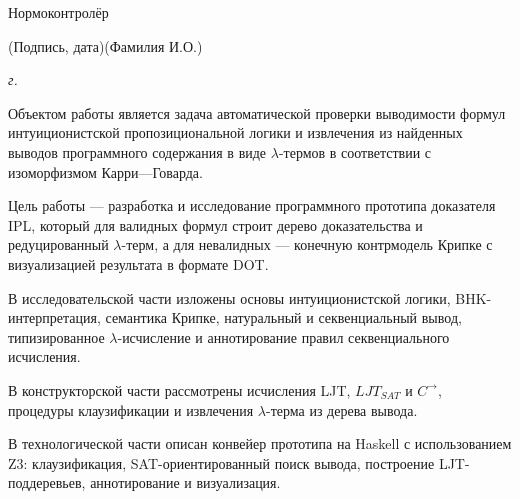 \documentclass[14pt, russian]{scrartcl}
\begin{document}
\begin{titlepage}
\noindent Нормоконтролёр  \hfill \underline{\hspace{4cm}}\quad
{}

\vspace{-0.5ex}
\noindent\hspace{13.5ex}\normalsize\hspace{170pt}\hspace{2ex}\scriptsize{(Подпись, дата)}\normalsize\hspace{30pt}\hspace{6ex}\scriptsize{(Фамилия И.О.)}\normalsize
\vfill

 


\begin{center}
\textsl{\the\year{} г.}
\end{center}
\end{titlepage}


\setlength{\tabcolsep}{3pt}
\newpage
\setcounter{page}{2}

Объектом работы является задача автоматической проверки выводимости формул
интуиционистской пропозициональной логики и извлечения из найденных выводов
программного содержания в виде $\lambda$-термов в соответствии с изоморфизмом
Карри---Говарда.

Цель работы --- разработка и исследование программного прототипа доказателя IPL,
который для валидных формул строит дерево доказательства и редуцированный
$\lambda$-терм, а для невалидных --- конечную контрмодель Крипке с визуализацией
результата в формате DOT.

В исследовательской части изложены основы интуиционистской логики, BHK-интерпретация,
семантика Крипке, натуральный и секвенциальный вывод, типизированное
$\lambda$-исчисление и аннотирование правил секвенциального исчисления.

В конструкторской части рассмотрены исчисления LJT, $LJT_{SAT}$ и
$C^{\rightarrow}$, процедуры клаузификации и извлечения $\lambda$-терма из
дерева вывода.

В технологической части описан конвейер прототипа на Haskell с использованием
Z3: клаузификация, SAT-ориентированный поиск вывода, построение LJT-поддеревьев,
аннотирование и визуализация.
\end{document}
